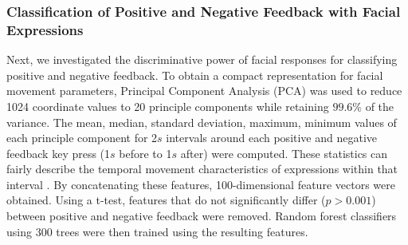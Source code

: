 \subsubsection{Classification of Positive and Negative Feedback with Facial Expressions}
\label{sec:classify}


Next, we investigated the discriminative power of facial
responses for classifying positive and negative feedback. To
obtain a compact representation for facial movement parameters,
Principal Component Analysis (PCA) was used to reduce 1024
coordinate values to 20 principle components while retaining
$99.6\%$ of the variance. The mean, median, standard deviation,
maximum, minimum values of each principle component for 2$s$
intervals around each positive and negative feedback key press
(1$s$ before to 1$s$ after) were computed. These statistics can fairly describe the temporal movement characteristics of expressions within that interval \cite{cohn2009detecting,dibeklioglu2015recognition,dibekliouglu2015multimodal}. By
concatenating these features, 100-dimensional feature vectors were
obtained. Using a t-test, features that do not significantly
differ ($p>0.001$) between positive and negative feedback were
removed. Random forest classifiers \cite{breiman2001random} %
using 300 trees were then trained using the resulting features.


